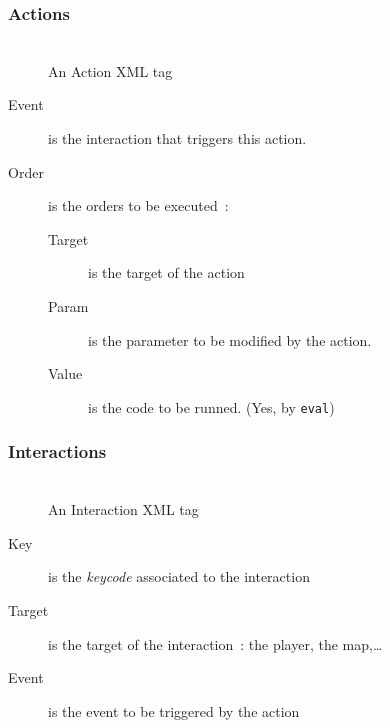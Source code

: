 \documentclass[11pt]{beamer}
\begin{document}
\subsubsection{Actions}

\begin{frame}[fragile]
    \frametitle{\subsecname}
    \begin{figure}
        \begin{adjustwidth}{0.1\textwidth}{}
            \scriptsize{\inputminted{xml}{test_files/actions.xml}}
        \end{adjustwidth}
        \caption{An Action XML tag}
    \end{figure}
    \begin{small}
        \begin{adjustwidth}{-0.1\textwidth}{}
            \begin{description}
                \item[Event] is the interaction that triggers this action.
                \item[Order] is the orders to be executed~:
                    \begin{description}
                        \item[Target] is the target of the action
                        \item[Param] is the parameter to be modified by the
                            action.
                        \item[Value] is the code to be runned. (Yes, by
                            \verb|eval|)
                    \end{description}
            \end{description}
        \end{adjustwidth}
    \end{small}
\end{frame}

\subsubsection{Interactions}

\begin{frame}
    \frametitle{\subsecname}
    \begin{figure}
        \begin{adjustwidth}{0.1\textwidth}{}
            \scriptsize{\inputminted{xml}{test_files/interactions.xml}}
        \end{adjustwidth}
        \caption{An Interaction XML tag}
    \end{figure}
    \begin{small}
        \begin{description}
            \item[Key] is the \emph{keycode} associated to the interaction
            \item[Target] is the target of the interaction~: the player, the
                map,\dots
            \item[Event] is the event to be triggered by the action
        \end{description}
    \end{small}
\end{frame}
\end{document}
